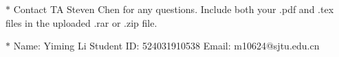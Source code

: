 \documentclass[12pt,a4paper]{article}
\theoremstyle{definition}
\begin{document}
\noindent

\noindent{}
\begin{center}
\footnotesize{\color{red}$*$ Contact TA Steven Chen for any questions. Include both your .pdf and .tex files in the uploaded .rar or .zip file.}

\footnotesize{\color{blue}$*$ Name: Yiming Li  \quad Student ID: 524031910538 \quad Email: m10624@sjtu.edu.cn}
\end{center}
\end{document}
